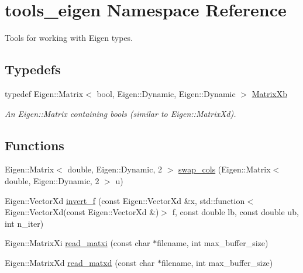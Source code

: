 \hypertarget{namespacetools__eigen}{}\section{tools\+\_\+eigen Namespace Reference}
\label{namespacetools__eigen}


Tools for working with Eigen types.  


\subsection*{Typedefs}
\begin{DoxyCompactItemize}
\item 
typedef Eigen\+::\+Matrix$<$ bool, Eigen\+::\+Dynamic, Eigen\+::\+Dynamic $>$ \hyperlink{namespacetools__eigen_ad496806a2d02c8e881330d95e0c150aa}{Matrix\+Xb}\hypertarget{namespacetools__eigen_ad496806a2d02c8e881330d95e0c150aa}{}\label{namespacetools__eigen_ad496806a2d02c8e881330d95e0c150aa}

\begin{DoxyCompactList}\small\item\em An {\ttfamily Eigen\+::\+Matrix} containing {\ttfamily bool}s (similar to {\ttfamily Eigen\+::\+Matrix\+Xd}). \end{DoxyCompactList}\end{DoxyCompactItemize}
\subsection*{Functions}
\begin{DoxyCompactItemize}
\item 
Eigen\+::\+Matrix$<$ double, Eigen\+::\+Dynamic, 2 $>$ \hyperlink{namespacetools__eigen_a5ec97cf8c69d2dd29c7d60fc5554bac0}{swap\+\_\+cols} (Eigen\+::\+Matrix$<$ double, Eigen\+::\+Dynamic, 2 $>$ u)
\item 
Eigen\+::\+Vector\+Xd \hyperlink{namespacetools__eigen_ad9c98ebe3d1a6722dc31aae311e62be0}{invert\+\_\+f} (const Eigen\+::\+Vector\+Xd \&x, std\+::function$<$ Eigen\+::\+Vector\+Xd(const Eigen\+::\+Vector\+Xd \&)$>$ f, const double lb, const double ub, int n\+\_\+iter)
\item 
Eigen\+::\+Matrix\+Xi \hyperlink{namespacetools__eigen_aa35ace9c5f71fa76cb545f011b34095e}{read\+\_\+matxi} (const char $\ast$filename, int max\+\_\+buffer\+\_\+size)
\item 
Eigen\+::\+Matrix\+Xd \hyperlink{namespacetools__eigen_a37c4357e7ae885e9e4d80e0242f4854e}{read\+\_\+matxd} (const char $\ast$filename, int max\+\_\+buffer\+\_\+size)
\end{DoxyCompactItemize}



